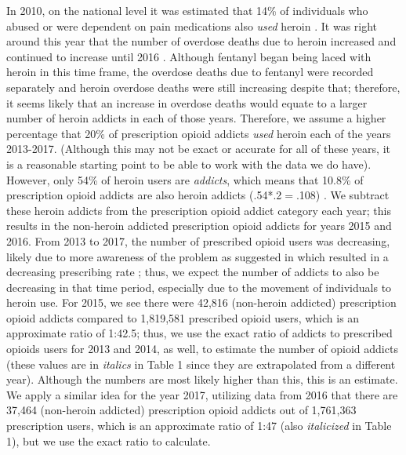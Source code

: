 \documentclass[12pt]{article}
\begin{document}
In 2010, on the national level it was estimated that 14\% of individuals who abused or were dependent on pain medications also \textit{used} heroin \cite{DrugAbuse}. It was right around this year that the number of overdose deaths due to heroin increased and continued to increase until 2016 \cite{TNgov1, CDC4}. Although fentanyl began being laced with heroin in this time frame, the overdose deaths due to fentanyl were recorded separately and heroin overdose deaths were still increasing despite that; therefore, it seems likely that an increase in overdose deaths would equate to a larger number of heroin addicts in each of those years. Therefore, we assume a higher percentage that 20\% of prescription opioid addicts \textit{used} heroin each of the years 2013-2017. (Although this may not be exact or accurate for all of these years, it is a reasonable starting point to be able to work with the data we do have). However, only 54\% of heroin users are \textit{addicts}, which means that 10.8\% of prescription opioid addicts are also heroin addicts (.54*.2$=$.108) \cite{DrugAbuse}. We subtract these heroin addicts from the prescription opioid addict category each year; this results in the non-heroin addicted prescription opioid addicts for years 2015 and 2016. 
From 2013 to 2017, the number of prescribed opioid users was decreasing, likely due to more awareness of the problem as suggested in \cite{CDC7} which resulted in a decreasing prescribing rate \cite{PDO}; thus, we expect the number of addicts to also be decreasing in that time period, especially due to the movement of individuals to heroin use. For 2015, we see there were 42,816 (non-heroin addicted) prescription opioid addicts compared to 1,819,581 prescribed opioid users, which is an approximate ratio of 1:42.5; thus, we use the exact ratio of addicts to prescribed opioids users for 2013 and 2014, as well, to estimate the number of opioid addicts (these values are in \textit{italics} in Table 1 since they are extrapolated from a different year). Although the numbers are most likely higher than this, this is an estimate. We apply a similar idea for the year 2017, utilizing data from 2016 that there are 37,464 (non-heroin addicted) prescription opioid addicts out of 1,761,363 prescription users, which is an approximate ratio of 1:47 (also \textit{italicized} in Table 1), but we use the exact ratio to calculate. \\
\end{document}
